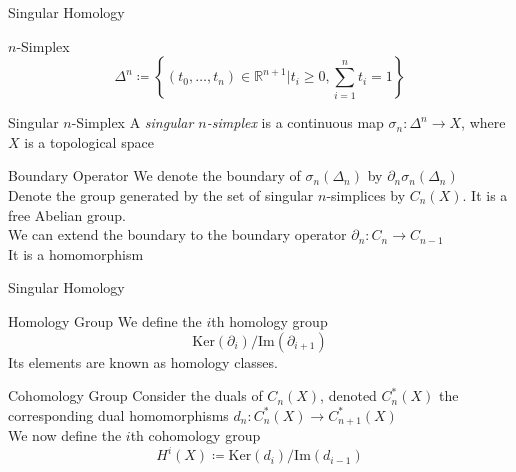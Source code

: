 \documentclass[handout]{beamer}
\newcommand{\Real}{\mathbb{R}}
\begin{document}
  \begin{frame}{Singular Homology}
      \pause
      \begin{block}{$n$-Simplex}
          $$\Delta^n \coloneqq \left\{(t_0, \ldots, t_n) \in \Real^{n+1} | t_i
          \ge 0, \sum_{i=1}^n t_i = 1\right\}$$
      \end{block}
      \pause
      \begin{block}{Singular $n$-Simplex}
          A \textit{singular $n$-simplex} is a continuous map $\sigma_n:
          \Delta^n \rightarrow X$, where $X$ is a topological space
      \end{block}
      \pause
      \begin{block}{Boundary Operator}
          We denote the boundary of $\sigma_n(\Delta_n)$ by $\partial_n
          \sigma_n (\Delta_n)$ \pause \\
          Denote the group generated by the set of singular $n$-simplices by
          $C_n(X)$. It is a free Abelian group. \pause \\
          We can extend the boundary to the boundary operator $\partial_n : C_n
          \rightarrow C_{n-1}$ \pause \\
          It is a homomorphism
      \end{block}
  \end{frame}
  \begin{frame}{Singular Homology}
      \pause
      \begin{block}{Homology Group}
          We define the $i$th homology group
          $$\mathrm{Ker}(\partial_i)/\mathrm{Im}(\partial_{i+1})$$
          Its elements are known as homology classes.
      \end{block}
      \pause
      \begin{block}{Cohomology Group}
          Consider the duals of $C_n(X)$, denoted $C^*_n(X)$ the corresponding
          dual homomorphisms $d_n : C^*_n(X) \rightarrow C^*_{n+1}(X)$ \pause
          \\
          We now define the $i$th cohomology group
          $$H^i(X) \coloneqq \mathrm{Ker}(d_i)/\mathrm{Im}(d_{i-1})$$
      \end{block}
  \end{frame}
\end{document}
